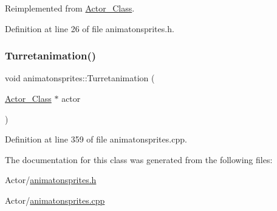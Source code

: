 Reimplemented from \hyperlink{class_actor___class_af1764a94c5410ba8476f56553cd2c327}{Actor\+\_\+\+Class}.



Definition at line 26 of file animatonsprites.\+h.

\hypertarget{classanimatonsprites_a82db8f9361e43e23f8044b35739dbb4f}{}\label{classanimatonsprites_a82db8f9361e43e23f8044b35739dbb4f} 
\subsubsection{\texorpdfstring{Turretanimation()}{Turretanimation()}}
{\footnotesize\ttfamily void animatonsprites\+::\+Turretanimation (\begin{DoxyParamCaption}\item[{\hyperlink{class_actor___class}{Actor\+\_\+\+Class} $\ast$}]{actor }\end{DoxyParamCaption})}



Definition at line 359 of file animatonsprites.\+cpp.



The documentation for this class was generated from the following files\+:\begin{DoxyCompactItemize}
\item 
Actor/\hyperlink{animatonsprites_8h}{animatonsprites.\+h}\item 
Actor/\hyperlink{animatonsprites_8cpp}{animatonsprites.\+cpp}\end{DoxyCompactItemize}
